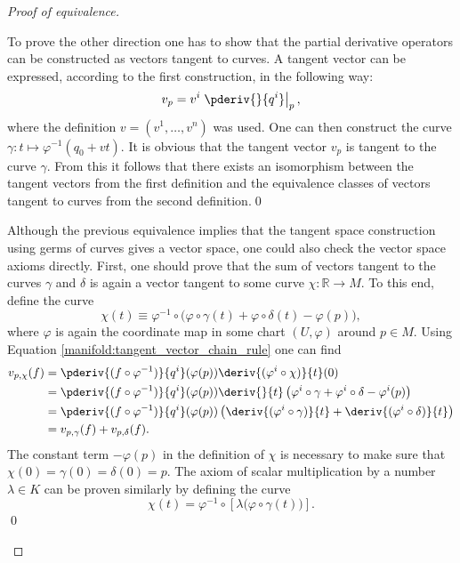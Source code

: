 {\begin{proof}[Proof of equivalence]
\begin{mdframed}[roundcorner=10pt, linecolor=blue, linewidth=1pt]
                To prove the other direction one has to show that the partial derivative operators can be constructed as vectors tangent to curves. A tangent vector can be expressed, according to the first construction, in the following way: \[v_p = v^i\left.\pderiv{}{q^i}\right|_p,\] where the definition $v = (v^1,\ldots,v^n)$ was used. One can then construct the curve $\gamma:t\mapsto\varphi^{-1}(q_0+vt)$. It is obvious that the tangent vector $v_p$ is tangent to the curve $\gamma$. From this it follows that there exists an isomorphism between the tangent vectors from the first definition and the equivalence classes of vectors tangent to curves from the second definition.\qed

                Although the previous equivalence implies that the tangent space construction using germs of curves gives a vector space, one could also check the vector space axioms directly. First, one should prove that the sum of vectors tangent to the curves $\gamma$ and $\delta$ is again a vector tangent to some curve $\chi:\mathbb{R}\rightarrow M$. To this end, define the curve \[\chi(t)\equiv\varphi^{-1}\circ\Big(\varphi\circ\gamma(t) + \varphi\circ\delta(t) - \varphi(p)\Big),\] where $\varphi$ is again the coordinate map in some chart $(U,\varphi)$ around $p\in M$. Using Equation \eqref{manifold:tangent_vector_chain_rule} one can find
                \begin{align*}
                    v_{p,\chi}(f) &= \pderiv{(f\circ\varphi^{-1})}{q^i}(\varphi(p))\deriv{(\varphi^i\circ\chi)}{t}(0)\\
                    &=\pderiv{(f\circ\varphi^{-1})}{q^i}(\varphi(p))\deriv{}{t}\left(\varphi^i\circ\gamma + \varphi^i\circ\delta - \varphi^i(p)\right)\\
                    &=\pderiv{(f\circ\varphi^{-1})}{q^i}(\varphi(p))\left(\deriv{(\varphi^i\circ\gamma)}{t} + \deriv{(\varphi^i\circ\delta)}{t}\right)\\
                    &=v_{p,\gamma}(f) + v_{p,\delta}(f).
                \end{align*}
                The constant term $-\varphi(p)$ in the definition of $\chi$ is necessary to make sure that $\chi(0) = \gamma(0) = \delta(0) = p$. The axiom of scalar multiplication by a number $\lambda\in K$ can be proven similarly by defining the curve \[\chi(t) = \varphi^{-1}\circ\left[\lambda\Big(\varphi\circ\gamma(t)\Big)\right].\]\qed
            \end{mdframed}
        \end{proof}
    }

